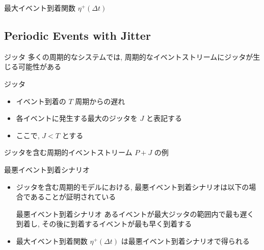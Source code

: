 \begin{frame}{最大イベント到着関数 $\eta^{+}(\Delta t)$}
\end{frame}


\subsection{Periodic Events with Jitter}
\label{ssec: periodic events with jitter}

\begin{frame}{ジッタ}
    多くの周期的なシステムでは, 周期的なイベントストリームにジッタが生じる可能性がある
    \begin{block}{ジッタ}
        \begin{itemize}
            \item イベント到着の $T$ 周期からの遅れ
            \item 各イベントに発生する最大のジッタを $J$ と表記する
            \item ここで, $J < T$ とする
        \end{itemize}
    \end{block}
\end{frame}

\begin{frame}{ジッタを含む周期的イベントストリーム $P+J$ の例}
\end{frame}

\begin{frame}{最悪イベント到着シナリオ}
    \begin{itemize}
        \item ジッタを含む周期的モデルにおける, 最悪イベント到着シナリオは以下の場合であることが証明されている
              \begin{block}{最悪イベント到着シナリオ}
                  あるイベントが最大ジッタの範囲内で最も遅く到着し, その後に到着するイベントが最も早く到着する
              \end{block}
              \vspace{5mm}
        \item 最大イベント到着関数 $\eta^{+}(\Delta t)$ は最悪イベント到着シナリオで得られる
    \end{itemize}
\end{frame}

